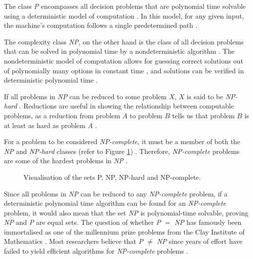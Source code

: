 \documentclass[a4paper, 12pt]{extreport}
\begin{document}
				The class \textit{P} encompasses all decision problems that are polynomial time solvable using a deterministic model of computation \cite{cc:modern}. In this model, for any given input, the machine's computation follows a single predetermined path \cite{sipser-intro-to-computation}. 
				
				The complexity class \textit{NP}, on the other hand is the class of all decision problems that can be solved in polynomial time by a nondeterministic algorithm \cite{computers-and-intractability}. The nondeterministic model of computation allows for guessing correct solutions out of polynomially many options in constant time \cite{npcompleteness}, and solutions can be verified in deterministic polynomial time \cite{sipser-intro-to-computation}.
				
				If all problems in \textit{NP} can be reduced to some problem $X$, $X$ is said to be \textit{NP-hard} \cite{sipser-intro-to-computation}. Reductions are useful in showing the relationship between computable problems, as a reduction from problem $A$ to problem $B$ tells us that problem $B$ is at least as hard as problem $A$ \cite{npcompleteness}.
				
				For a problem to be considered \textit{NP-complete}, it must be a member of both the \textit{NP} and \textit{NP-hard} classes (refer to Figure \ref{fig:p,np,npcomplete}) \cite{npcompleteness}. Therefore, \textit{NP-complete} problems are some of the hardest problems in \textit{NP} \cite{cc:modern}.
				
				\begin{figure}
					\centering
					\begin{adjustbox}{max width=\linewidth}
					\end{adjustbox}
					\caption{\centering Visualisation of the sets P, NP, NP-hard and NP-complete.}
					\label{fig:p,np,npcomplete}
				\end{figure}
				
				Since all problems in \textit{NP} can be reduced to any \textit{NP-complete} problem, if a deterministic polynomial time algorithm can be found for an \textit{NP-complete} problem, it would also mean that the set \textit{NP} is polynomial-time solvable, proving \textit{NP} and \textit{P} are equal sets. The question of whether \textit{P} $=$ \textit{NP} has famously been immortalised as one of the millennium prize problems from the Clay Institute of Mathematics \cite{claymathMillenniumPrize}. Most researchers believe that \textit{P} $\ne$ \textit{NP} since years of effort have failed to yield efficient algorithms for \textit{NP-complete} problems \cite{cc:modern}.
			
\end{document}
